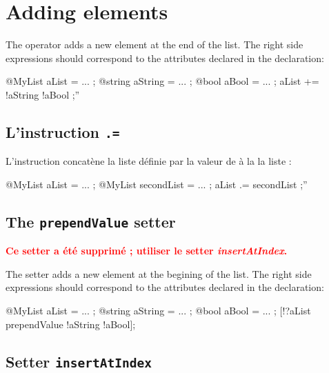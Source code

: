 \section{Adding elements}


The  \galgas{+=} operator adds a new element at the end of the list. The right side expressions should correspond to the attributes declared in the  declaration:\\

\begin{galgascode}
@MyList aList = ... ;
@string aString = ... ;
@bool aBool = ... ;
aList += !aString !aBool ;''
\end{galgascode}


\subsection{L'instruction \texttt{.=}}

L'instruction  concatène la liste définie par la valeur de  à la la liste  :

\begin{galgascode}
@MyList aList = ... ;
@MyList secondList = ... ;
aList .= secondList ;''
\end{galgascode}



\subsection{The \texttt{prependValue} setter}

{\bf \textcolor{red}{Ce setter a été supprimé ; utiliser le setter \emph{insertAtIndex}.}}

The  setter adds a new element at the begining of the list. The right side expressions should correspond to the attributes declared in the   declaration:

\begin{galgascode}
@MyList aList = ... ;
@string aString = ... ;
@bool aBool = ... ;
[!?aList prependValue !aString !aBool];
\end{galgascode}




\subsection{Setter \texttt{insertAtIndex}}

